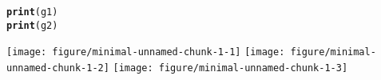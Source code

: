 \documentclass{article}\usepackage[]{graphicx}\usepackage[]{color}
\makeatletter
\def\maxwidth{ %
  \ifdim\Gin@nat@width>\linewidth
    \linewidth
  \else
    \Gin@nat@width
  \fi
}
\newcommand{\hlstd}[1]{\textcolor[rgb]{0.345,0.345,0.345}{#1}}%
\newcommand{\hlkwd}[1]{\textcolor[rgb]{0.737,0.353,0.396}{\textbf{#1}}}%
\newenvironment{kframe}{%
 \def\at@end@of@kframe{}%
 \ifinner\ifhmode%
  \def\at@end@of@kframe{\end{minipage}}%
  \begin{minipage}{\columnwidth}%
 \fi\fi%
 \def\FrameCommand##1{\hskip\@totalleftmargin \hskip-\fboxsep
 \colorbox{shadecolor}{##1}\hskip-\fboxsep
     \hskip-\linewidth \hskip-\@totalleftmargin \hskip\columnwidth}%
 \MakeFramed {\advance\hsize-\width
   \@totalleftmargin\z@ \linewidth\hsize
   \@setminipage}}%
 {\par\unskip\endMakeFramed%
 \at@end@of@kframe}
\newenvironment{knitrout}{}{} %
\makeatother
\begin{document}
\begin{knitrout}
\begin{kframe}
\begin{alltt}
\hlkwd{print}\hlstd{(g1)}
\hlkwd{print}\hlstd{(g2)}
\end{alltt}
\end{kframe}

{\centering \texttt{[image: figure/minimal-unnamed-chunk-1-1]} 
\texttt{[image: figure/minimal-unnamed-chunk-1-2]} 
\texttt{[image: figure/minimal-unnamed-chunk-1-3]} 

}



\end{knitrout}
\end{document}
